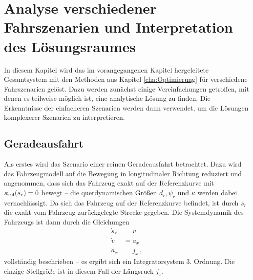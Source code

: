 \chapter{Analyse verschiedener Fahrszenarien und Interpretation des Lösungsraumes}\label{cha:Ergebnisse}
In diesem Kapitel wird das im vorangegangenen Kapitel hergeleitete Gesamtsystem mit den Methoden aus Kapitel \ref{cha:Optimierung} für verschiedene Fahrszenarien gelöst. Dazu werden zunächst einige Vereinfachungen getroffen, mit denen es teilweise möglich ist, eine analytische Lösung zu finden. Die Erkenntnisse der einfacheren Szenarien werden dann verwendet, um die Lösungen komplexerer Szenarien zu interpretieren. 

\section{Geradeausfahrt}
Als erstes wird das Szenario einer reinen Geradeausfahrt betrachtet. Dazu wird das Fahrzeugmodell auf die Bewegung in longitudinaler Richtung reduziert und angenommen, dass sich das Fahrzeug exakt auf der Referenzkurve mit $\kappa_{\textrm{ref}}(s_r) = 0$ bewegt -- die querdynamischen Größen $d_r, \psi_r$ und $\kappa$ werden dabei vernachlässigt. Da sich das Fahrzeug auf der Referenzkurve befindet, ist durch $s_r$ die exakt vom Fahrzeug zurückgelegte Strecke gegeben. Die Systemdynamik des Fahrzeugs ist dann durch die Gleichungen 
\begin{align}
\dot{s}_r &= v \\
\dot{v} &= a_x \\
\dot{a}_x &= j_x \,,
\end{align}
vollständig beschrieben -- es ergibt sich ein Integratorsystem 3. Ordnung. Die einzige Stellgröße ist in diesem Fall der Längsruck $j_x$.

